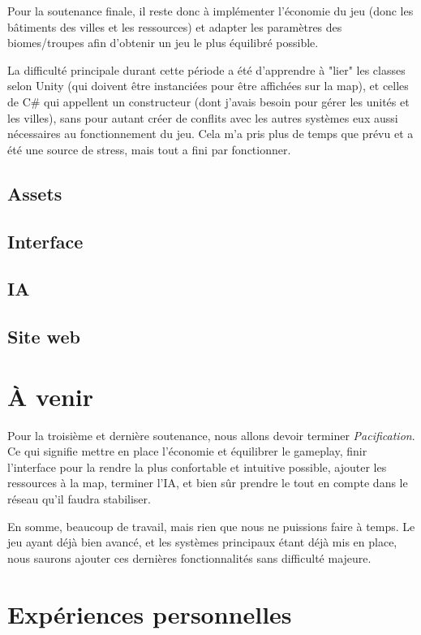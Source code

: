 \documentclass[12pt]{report}
\begin{document}
Pour la soutenance finale, il reste donc à implémenter l’économie du jeu (donc
les bâtiments des villes et les ressources) et adapter les paramètres des
biomes/troupes afin d’obtenir un jeu le plus équilibré possible.

La difficulté principale durant cette période a été d'apprendre à "lier" les
classes selon Unity (qui doivent être instanciées pour être affichées sur la
map), et celles de C\# qui appellent un constructeur (dont j'avais besoin pour
gérer les unités et les villes), sans pour autant créer de conflits avec les
autres systèmes eux aussi nécessaires au fonctionnement du jeu. Cela m'a pris
plus de temps que prévu et a été une source de stress, mais tout a fini par
fonctionner.

\section*{Assets}

\section*{Interface}

\section*{IA}

\section*{Site web}

\chapter{À venir}

Pour la troisième et dernière soutenance, nous allons devoir terminer
\textit{Pacification}. Ce qui signifie mettre en place l'économie et équilibrer
le gameplay, finir l'interface pour la rendre la plus confortable et intuitive
possible, ajouter les ressources à la map, terminer l'IA, et bien sûr prendre
le tout en compte dans le réseau qu'il faudra stabiliser.

En somme, beaucoup de travail, mais rien que nous ne puissions faire à temps.
Le jeu ayant déjà bien avancé, et les systèmes principaux étant déjà mis en
place, nous saurons ajouter ces dernières fonctionnalités sans difficulté
majeure.

\chapter{Expériences personnelles}
\end{document}
